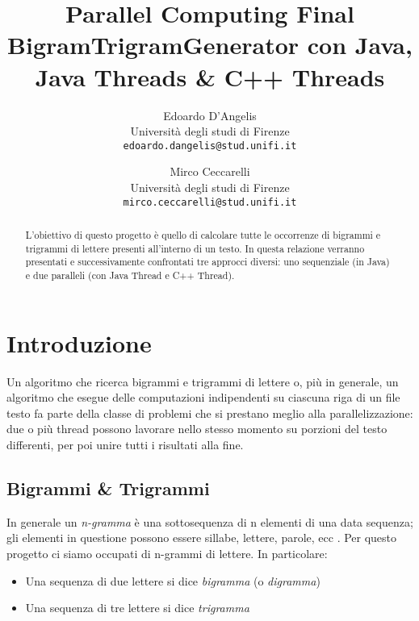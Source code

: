 \documentclass[10pt,twocolumn,letterpaper]{article}
\begin{document}
\title{Parallel Computing Final\\BigramTrigramGenerator con Java, Java Threads \& C++ Threads}

\author{Edoardo D'Angelis\\
Università degli studi di Firenze\\
{\tt\small edoardo.dangelis@stud.unifi.it}
\and
Mirco Ceccarelli\\
Università degli studi di Firenze\\
{\tt\small mirco.ceccarelli@stud.unifi.it}
}

\maketitle
\thispagestyle{empty}

\begin{abstract}
L'obiettivo di questo progetto è quello di calcolare tutte le occorrenze di bigrammi e trigrammi di lettere presenti all'interno di un testo. In questa relazione verranno presentati e successivamente confrontati tre approcci diversi: uno sequenziale (in Java) e due paralleli (con Java Thread e C++ Thread).
\end{abstract}

\section{Introduzione}
Un algoritmo che ricerca bigrammi e trigrammi di lettere o, più in generale, un algoritmo che esegue delle computazioni indipendenti su ciascuna riga di un file testo fa parte della classe di problemi che si prestano meglio alla parallelizzazione: due o più thread possono lavorare nello stesso momento su porzioni del testo differenti, per poi unire tutti i risultati alla fine.
   
\subsection{Bigrammi \& Trigrammi}
In generale un \textit{n-gramma} è una sottosequenza di n elementi di una data sequenza; gli elementi in questione possono essere sillabe, lettere, parole, ecc \cite{N-GRAMMA}. Per questo progetto ci siamo occupati di n-grammi di lettere. In particolare:
\begin{itemize}
	\item Una sequenza di due lettere si dice \textit{bigramma} (o \textit{digramma})
	\item Una sequenza di tre lettere si dice \textit{trigramma}
\end{itemize}
\end{document}
